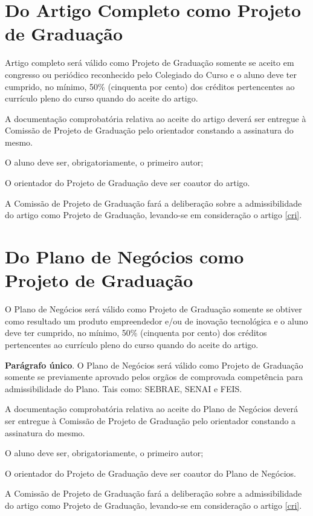 \documentclass[12pt,geral,titlewithdate]{uftdocs}
\begin{document}
\chapter{Do Artigo Completo como Projeto de Graduação}

\artigo Artigo completo será válido como Projeto de Graduação somente se aceito em congresso ou periódico reconhecido pelo Colegiado do Curso e o aluno deve ter cumprido, no mínimo, 50\% (cinquenta por cento) dos créditos pertencentes ao currículo pleno do curso quando do aceite do artigo.

\artigo A documentação comprobatória relativa ao aceite do artigo deverá ser entregue à Comissão de Projeto de Graduação pelo orientador constando a assinatura do mesmo. 

\begin{paragrafos}
\paragrafo O aluno deve ser, obrigatoriamente, o primeiro autor;

\paragrafo O orientador do Projeto de Graduação deve ser coautor do artigo.

\paragrafo A Comissão de Projeto de Graduação fará a deliberação sobre a admissibilidade do artigo como Projeto de Graduação, levando-se em consideração o artigo \ref{cri}.
 
\end{paragrafos}

\chapter{Do Plano de Negócios como Projeto de Graduação}

\artigo O Plano de Negócios será válido como Projeto de Graduação somente se obtiver como resultado um produto empreendedor e/ou de inovação tecnológica e o aluno deve ter cumprido, no mínimo, 50\% (cinquenta por cento) dos créditos pertencentes ao currículo pleno do curso quando do aceite do artigo.

{\bf Parágrafo único}. O Plano de Negócios será válido como Projeto de Graduação somente se previamente aprovado pelos orgãos de comprovada competência para admissibilidade do Plano. Tais como: SEBRAE, SENAI e FEIS.

\artigo A documentação comprobatória relativa ao aceite do Plano de Negócios deverá ser entregue à Comissão de Projeto de Graduação pelo orientador constando a assinatura do mesmo. 

\begin{paragrafos}
\paragrafo O aluno deve ser, obrigatoriamente, o primeiro autor;

\paragrafo O orientador do Projeto de Graduação deve ser coautor do Plano de Negócios.

\paragrafo A Comissão de Projeto de Graduação fará a deliberação sobre a admissibilidade do artigo como Projeto de Graduação, levando-se em consideração o artigo \ref{cri}.
 
\end{paragrafos}
\end{document}
